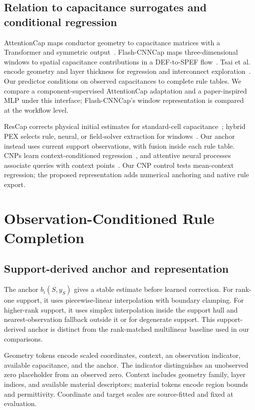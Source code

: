\documentclass[conference,10pt,letterpaper]{IEEEtran}
\begin{document}
\subsection{Relation to capacitance surrogates and conditional regression}
AttentionCap maps conductor geometry to capacitance matrices with a Transformer and symmetric output~\cite{attentioncap}. Flash-CNNCap maps three-dimensional windows to spatial capacitance contributions in a DEF-to-SPEF flow~\cite{flash}. Tsai et al. encode geometry and layer thickness for regression and interconnect exploration~\cite{tsai}. Our predictor conditions on observed capacitances to complete rule tables. We compare a component-supervised AttentionCap adaptation and a paper-inspired MLP under this interface; Flash-CNNCap's window representation is compared at the workflow level.

ResCap corrects physical initial estimates for standard-cell capacitance~\cite{rescap}; hybrid PEX selects rule, neural, or field-solver extraction for windows~\cite{hybrid}. Our anchor instead uses current support observations, with fusion inside each rule table. CNPs learn context-conditioned regression~\cite{cnp}, and attentive neural processes associate queries with context points~\cite{anp}. Our CNP control tests mean-context regression; the proposed representation adds numerical anchoring and native rule export.

\section{Observation-Conditioned Rule Completion}

\subsection{Support-derived anchor and representation}
The anchor $b_i(S,y_S)$ gives a stable estimate before learned correction. For rank-one support, it uses piecewise-linear interpolation with boundary clamping. For higher-rank support, it uses simplex interpolation inside the support hull and nearest-observation fallback outside it or for degenerate support. This support-derived anchor is distinct from the rank-matched multilinear baseline used in our comparisons.

Geometry tokens encode scaled coordinates, context, an observation indicator, available capacitance, and the anchor. The indicator distinguishes an unobserved zero placeholder from an observed zero. Context includes geometry family, layer indices, and available material descriptors; material tokens encode region bounds and permittivity. Coordinate and target scales are source-fitted and fixed at evaluation.
\end{document}
